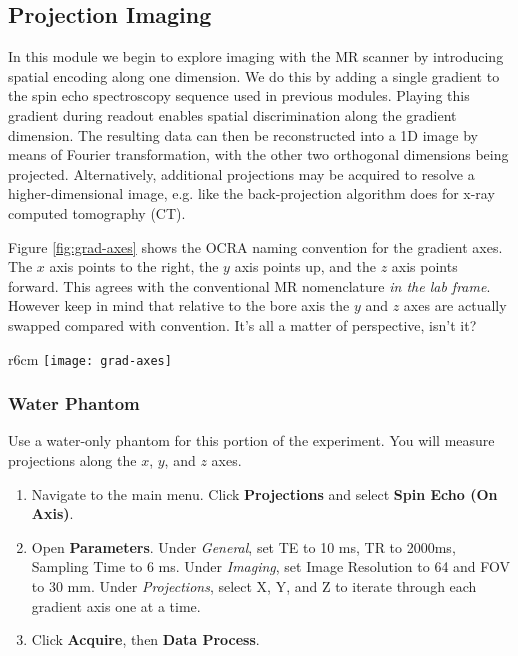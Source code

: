 \newpage
\subsection{Projection Imaging}

In this module we begin to explore imaging with the MR scanner by introducing spatial encoding along one dimension. We do this by adding a single gradient to the spin echo spectroscopy sequence used in previous modules. Playing this gradient during readout enables spatial discrimination along the gradient dimension. The resulting data can then be reconstructed into a 1D image by means of Fourier transformation, with the other two orthogonal dimensions being projected. Alternatively, additional projections may be acquired to resolve a higher-dimensional image, e.g. like the back-projection algorithm does for x-ray computed tomography (CT).

Figure \ref{fig:grad-axes} shows the OCRA naming convention for the gradient axes. The $x$ axis points to the right, the $y$ axis points up, and the $z$ axis points forward. This agrees with the conventional MR nomenclature \emph{in the lab frame}. However keep in mind that relative to the bore axis the $y$ and $z$ axes are actually swapped compared with convention. It's all a matter of perspective, isn't it?

\begin{wrapfigure}{r}{6cm}
    \centering
    \vspace{-10mm}
    \texttt{[image: grad-axes]}
    \caption{\label{fig:grad-axes} OCRA naming convention for gradient axes with sample bore in blue.}
    \vspace{-10mm}
\end{wrapfigure}

\subsubsection{Water Phantom}
Use a water-only phantom for this portion of the experiment. You will measure projections along the $x$, $y$, and $z$ axes.

\begin{enumerate}
    \item   Navigate to the main menu. Click \textbf{Projections} and select \textbf{Spin Echo (On Axis)}.
    \item   Open \textbf{Parameters}. Under \emph{General}, set TE to 10 ms, TR to 2000ms, Sampling Time to 6 ms. Under \emph{Imaging}, set Image Resolution to 64 and FOV to 30 mm. Under \emph{Projections}, select X, Y, and Z to iterate through each gradient axis one at a time.
    \item   Click \textbf{Acquire}, then \textbf{Data Process}.
\end{enumerate}

